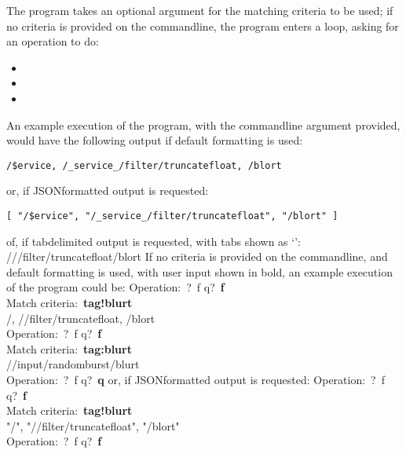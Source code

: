 The program takes an optional argument for the matching criteria to be used; if no
criteria is provided on the command\longDash{}line, the program enters a loop, asking for
an operation to do:
\begin{itemize}
\item{}
\item\exSp{}
\item\exSp{}
\end{itemize}
An example execution of the program, with the command\longDash{}line argument
 provided, would have the following output if default formatting is
used:
\outputBegin{}
\begin{verbatim}
/$ervice, /_service_/filter/truncatefloat, /blort
\end{verbatim}
\outputEnd{}
or, if JSON\longDash{}formatted output is requested:
\outputBegin{}
\begin{verbatim}
[ "/$ervice", "/_service_/filter/truncatefloat", "/blort" ]
\end{verbatim}
\outputEnd{}
of, if tab\longDash{}delimited output is requested, with tabs shown as `\tabSymbol':
\outputBegin{}
/\dollarService\pseudotab/\serviceName/filter/truncatefloat\pseudotab/blort
\outputEnd{}
If no criteria is provided on the command\longDash{}line, and default formatting is used,
with user input shown in bold, an example execution of the program could be:
\outputBegin{}
Operation:\ \openSq{}?\ f q\closeSq{}?\ \textbf{f}\\
Match criteria:\ \textbf{tag!blurt}\\
/\dollarService, /\serviceName/filter/truncatefloat, /blort\\
Operation:\ \openSq{}?\ f q\closeSq{}?\ \textbf{f}\\
Match criteria:\ \textbf{tag:blurt}\\
/\serviceName/input/randomburst/blurt\\
Operation:\ \openSq{}?\ f q\closeSq{}?\ \textbf{q}
\outputEnd{}
\condPage{}
or, if JSON\longDash{}formatted output is requested:
\outputBegin{}
Operation:\ \openSq{}?\ f q\closeSq{}?\ \textbf{f}\\
Match criteria:\ \textbf{tag!blurt}\\
\openSq{} "/\dollarService", "/\serviceName/filter/truncatefloat", "/blort" \closeSq\\
Operation:\ \openSq{}?\ f q\closeSq{}?\ \textbf{f}\\
